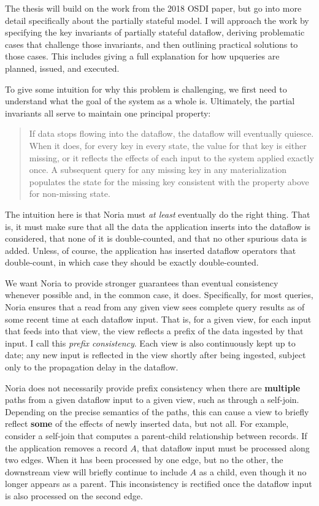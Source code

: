 \documentclass[12pt,letterpaper,twoside]{article}
\begin{document}
The thesis will build on the work from the 2018 OSDI paper, but go into more
detail specifically about the partially stateful model. I will approach the work
by specifying the key invariants of partially stateful dataflow, deriving
problematic cases that challenge those invariants, and then outlining practical
solutions to those cases. This includes giving a full explanation for how
upqueries are planned, issued, and executed.

To give some intuition for why this problem is challenging, we first need to
understand what the goal of the system as a whole is. Ultimately, the partial
invariants all serve to maintain one principal property:

\begin{quote}
	If data stops flowing into the dataflow, the dataflow will eventually
	quiesce. When it does, for every key in every state, the value for that
	key is either missing, or it reflects the effects of each input to the
	system applied exactly once. A subsequent query for any missing key in
	any materialization populates the state for the missing key consistent
	with the property above for non-missing state.
\end{quote}

The intuition here is that Noria must \emph{at least} eventually do the right
thing. That is, it must make sure that all the data the application inserts into
the dataflow is considered, that none of it is double-counted, and that no other
spurious data is added. Unless, of course, the application has inserted dataflow
operators that double-count, in which case they should be exactly
double-counted.

We want Noria to provide stronger guarantees than eventual consistency whenever
possible and, in the common case, it does. Specifically, for most queries, Noria
ensures that a read from any given view sees complete query results as of some
recent time at each dataflow input. That is, for a given view, for each input
that feeds into that view, the view reflects a prefix of the data ingested by
that input. I call this \emph{prefix consistency}. Each view is also
continuously kept up to date; any new input is reflected in the view shortly
after being ingested, subject only to the propagation delay in the dataflow.

Noria does not necessarily provide prefix consistency when there are
\textbf{multiple} paths from a given dataflow input to a given view, such as
through a self-join. Depending on the precise semantics of the paths, this can
cause a view to briefly reflect \textbf{some} of the effects of newly inserted
data, but not all. For example, consider a self-join that computes a
parent-child relationship between records. If the application removes a record
$A$, that dataflow input must be processed along two edges. When it has been
processed by one edge, but no the other, the downstream view will briefly
continue to include $A$ as a child, even though it no longer appears as a
parent. This inconsistency is rectified once the dataflow input is also
processed on the second edge.
\end{document}
